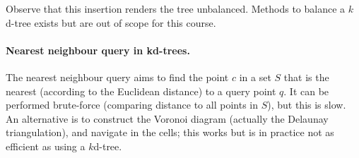 Observe that this insertion renders the tree unbalanced.
Methods to balance a $k$d-tree exists but are out of scope for this course.


\paragraph{Nearest neighbour query in kd-trees.}
\label{sec:knn}

The nearest neighbour query aims to find the point $c$ in a set $S$ that is the nearest (according to the Euclidean distance) to a query point $q$.
It can be performed brute-force (comparing distance to all points in $S$), but this is slow.
An alternative is to construct the Voronoi diagram (actually the Delaunay triangulation), and navigate in the cells; this works but is in practice not as efficient as using a $k$d-tree.


%

